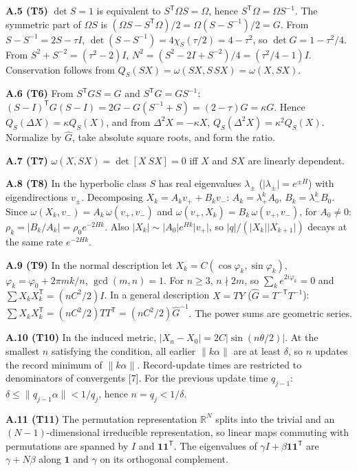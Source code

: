 \documentclass[
  a4paper,
]{article}
\begin{document}
\textbf{A.5 (T5)} \(\det S=1\) is equivalent to
\(S^{\mathsf T}\Omega S=\Omega\), hence
\(S^{\mathsf T}\Omega=\Omega S^{-1}\). The symmetric part of
\(\Omega S\) is
\((\Omega S-S^{\mathsf T}\Omega)/2=\Omega(S-S^{-1})/2=G\). From
\(S-S^{-1}=2S-\tau I\), \(\det(S-S^{-1})=4\chi_S(\tau/2)=4-\tau^2\), so
\(\det G=1-\tau^2/4\). From \(S^2+S^{-2}=(\tau^2-2)I\),
\(N^2=(S^2-2I+S^{-2})/4=(\tau^2/4-1)I\). Conservation follows from
\(Q_S(SX)=\omega(SX,S\,SX)=\omega(X,SX)\).

\textbf{A.6 (T6)} From \(S^{\mathsf T}GS=G\) and
\(S^{\mathsf T}G=GS^{-1}\):
\((S-I)^{\mathsf T}G(S-I)=2G-G(S^{-1}+S)=(2-\tau)G=\kappa G\). Hence
\(Q_S(\Delta X)=\kappa Q_S(X)\), and from \(\Delta^2X=-\kappa X\),
\(Q_S(\Delta^2X)=\kappa^2Q_S(X)\). Normalize by \(\hat G\), take
absolute square roots, and form the ratio.

\textbf{A.7 (T7)} \(\omega(X,SX)=\det[X\ SX]=0\) iff \(X\) and \(SX\)
are linearly dependent.

\textbf{A.8 (T8)} In the hyperbolic class \(S\) has real eigenvalues
\(\lambda_\pm\) (\(\lvert\lambda_\pm\rvert=e^{\pm H}\)) with
eigendirections \(v_\pm\). Decomposing \(X_k=A_kv_++B_kv_-\):
\(A_k=\lambda_+^kA_0\), \(B_k=\lambda_-^kB_0\). Since
\(\omega(X_k,v_-)=A_k\,\omega(v_+,v_-)\) and
\(\omega(v_+,X_k)=B_k\,\omega(v_+,v_-)\), for \(A_0\neq0\):
\(\rho_k=\lvert B_k/A_k\rvert=\rho_0e^{-2Hk}\). Also
\(\lvert X_k\rvert\sim\lvert A_0\rvert e^{Hk}\lvert v_+\rvert\), so
\(\lvert q\rvert/(\lvert X_k\rvert\lvert X_{k+1}\rvert)\) decays at the
same rate \(e^{-2Hk}\).

\textbf{A.9 (T9)} In the normal description let
\(X_k=C(\cos\varphi_k,\sin\varphi_k)\),
\(\varphi_k=\varphi_0+2\pi mk/n\), \(\gcd(m,n)=1\). For \(n\ge3\),
\(n\nmid2m\), so \(\sum_ke^{2i\varphi_k}=0\) and
\(\sum X_kX_k^{\mathsf T}=(nC^2/2)I\). In a general description \(X=TY\)
(\(\hat G=T^{-\mathsf T}T^{-1}\)):
\(\sum X_kX_k^{\mathsf T}=(nC^2/2)TT^{\mathsf T}=(nC^2/2)\hat G^{-1}\).
The power sums are geometric series.

\textbf{A.10 (T10)} In the induced metric,
\(\lvert X_n-X_0\rvert=2C\lvert\sin(n\theta/2)\rvert\). At the smallest
\(n\) satisfying the condition, all earlier \(\|k\alpha\|\) are at least
\(\delta\), so \(n\) updates the record minimum of \(\|k\alpha\|\).
Record-update times are restricted to denominators of convergents
{[}7{]}. For the previous update time \(q_{j-1}\):
\(\delta\le\|q_{j-1}\alpha\|<1/q_j\), hence \(n=q_j<1/\delta\).

\textbf{A.11 (T11)} The permutation representation \(\mathbb R^N\)
splits into the trivial and an \((N-1)\)-dimensional irreducible
representation, so linear maps commuting with permutations are spanned
by \(I\) and \(\mathbf 1\mathbf 1^{\mathsf T}\). The eigenvalues of
\(\gamma I+\beta\mathbf 1\mathbf 1^{\mathsf T}\) are \(\gamma+N\beta\)
along \(\mathbf 1\) and \(\gamma\) on its orthogonal complement.
\end{document}
